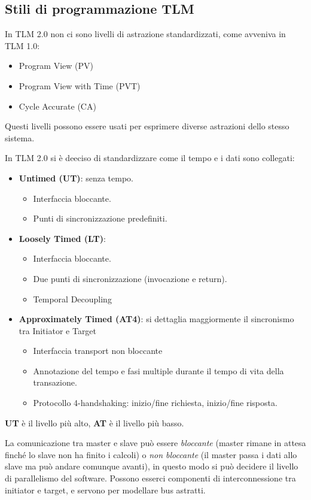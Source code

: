 \documentclass[a4paper]{article}
\theoremstyle{definition}
\begin{document}
		\subsection{Stili di programmazione TLM}
			In TLM 2.0 non ci sono livelli di astrazione standardizzati, come avveniva in TLM 1.0:
			\begin{itemize}
				\item Program View (PV)
				\item Program View with Time (PVT)
				\item Cycle Accurate (CA)
			\end{itemize}
			Questi livelli possono essere usati per esprimere diverse astrazioni dello stesso sistema.
			
			\noindent
			In TLM 2.0 si è deeciso di standardizzare come il tempo e i dati sono collegati:
			\begin{itemize}
				\item \textbf{Untimed (UT)}: senza tempo. 
					\begin{itemize}
						\item Interfaccia bloccante. 
						\item Punti di sincronizzazione predefiniti.
					\end{itemize}
				\item \textbf{Loosely Timed (LT)}:
					\begin{itemize}
						\item Interfaccia bloccante.
						\item Due punti di sincronizzazione (invocazione e return).
						\item Temporal Decoupling
					\end{itemize}
				\item \textbf{Approximately Timed (AT4)}: si dettaglia maggiormente il sincronismo tra Initiator e Target
					\begin{itemize}
						\item Interfaccia transport non bloccante
						\item Annotazione del tempo e fasi multiple durante il tempo di vita della transazione.
						\item Protocollo 4-handshaking: inizio/fine richiesta, inizio/fine risposta.
					\end{itemize}
			\end{itemize}
			
			\textbf{UT} è il livello più alto, \textbf{AT} è il livello più basso. 
			
			La comunicazione tra master e slave può essere \textit{bloccante} (master rimane in attesa finché lo slave non ha finito i calcoli) o \textit{non bloccante} (il master passa i dati allo slave ma può andare comunque avanti), in questo modo si può decidere il livello di parallelismo del software. Possono esserci componenti di interconnessione tra initiator e target, e servono per modellare bus astratti.
			
\end{document}
